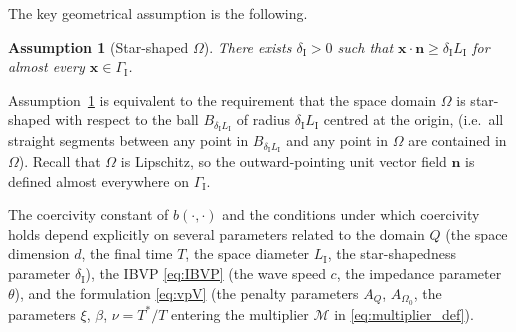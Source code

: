 \documentclass[a4paper]{article}
\theoremstyle{plain}
\newtheorem{assumption}[theorem]{Assumption}
\theoremstyle{definition}
\newcommand{\operator}[1]{\mathcal{#1}}
\newcommand{\vect}[1]{\bm{#1}}
\newcommand{\LI}{L_{\mathrm I}}
\newcommand{\deltaI}{{\delta_{\mathrm I}}}
\newcommand{\GI}{{\Gamma_{\mathrm I}}}
\newcommand{\oM}{{\operator{M}}}
\newcommand{\OZ}{{\Omega_0}}
\begin{document}
The key geometrical assumption is the following.
\begin{assumption}[Star-shaped $\Omega$]\label{ass:StarS}
	There exists $\deltaI > 0 $ such that $\vect{x}\cdot\vect{n} \geq \deltaI \LI$ for almost every $\vect x\in \GI$.
\end{assumption}
Assumption~\ref{ass:StarS} is equivalent to the requirement that the space domain $\Omega$ is star-shaped with respect to the ball $B_{\deltaI\LI}$ of radius $\deltaI \LI$ centred at the origin, \cite[Rem.~3.5]{Moiola2014} (i.e.\ all straight segments between any point in $B_{\deltaI\LI}$
and any point in $\Omega$ are contained in $\Omega$).
Recall that $\Omega$ is Lipschitz, so the outward-pointing unit vector field $\vect n$ is defined almost everywhere on $\GI$.


The coercivity constant of $b(\cdot,\cdot)$ and the conditions under which coercivity holds depend explicitly on several parameters related to the domain $Q$
(the space dimension $d$,
the final time $T$,
the space diameter $\LI$,
the star-shapedness parameter $\deltaI$),
the IBVP \eqref{eq:IBVP}
(the wave speed $c$,
the impedance parameter $\theta$),
and the formulation \eqref{eq:vpV}
(the penalty parameters $A_Q$, $A_\OZ$,
the parameters $\xi$, $\beta$, $\nu=T^*/T$ entering the multiplier $\oM$ in \eqref{eq:multiplier_def}).
\end{document}
